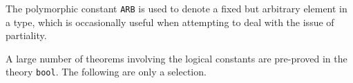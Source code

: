 The polymorphic constant {\small\verb+ARB+} is used to denote a fixed
but arbitrary element in a type, which is occasionally useful when
attempting to deal with the issue of partiality.

%
%
%
%
%
%
%
%
%
%
%
%
%
%

A large number of theorems involving the logical constants are
pre-proved in the theory {\small\verb+bool+}. The following are only a
selection.


